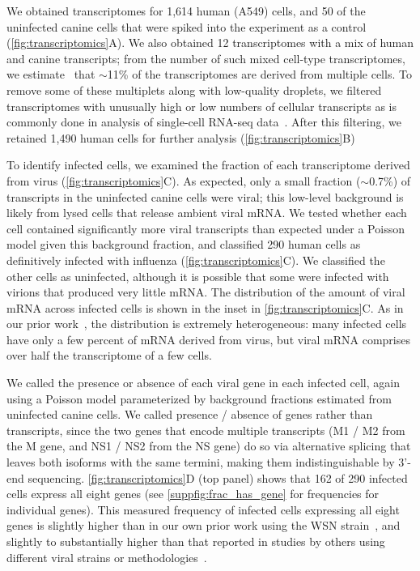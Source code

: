 \documentclass[lineno]{asm-article}
\newcommand{\FIG}[1]{\autoref{fig:#1}}
\newcommand{\SUPPFIG}[1]{\autoref{suppfig:#1}}
\begin{document}
We obtained transcriptomes for 1,614 human (A549) cells, and 50 of the uninfected canine cells that were spiked into the experiment as a control (\FIG{transcriptomics}A).
We also obtained 12 transcriptomes with a mix of human and canine transcripts; from the number of such mixed cell-type transcriptomes, we estimate~\cite{bloom2018estimating} that $\sim$11\% of the transcriptomes are derived from multiple cells.
To remove some of these multiplets along with low-quality droplets, we filtered transcriptomes with unusually high or low numbers of cellular transcripts as is commonly done in analysis of single-cell RNA-seq data~\cite{haque2017practical}.
After this filtering, we retained 1,490 human cells for further analysis (\FIG{transcriptomics}B)

To identify infected cells, we examined the fraction of each transcriptome derived from virus (\FIG{transcriptomics}C).
As expected, only a small fraction ($\sim$0.7\%) of transcripts in the uninfected canine cells were viral; this low-level background is likely from lysed cells that release ambient viral mRNA.
We tested whether each cell contained significantly more viral transcripts than expected under a Poisson model given this background fraction, and classified 290 human cells as definitively infected with influenza (\FIG{transcriptomics}C).
We classified the other cells as uninfected, although it is possible that some were infected with virions that produced very little mRNA.
The distribution of the amount of viral mRNA across infected cells is shown in the inset in \FIG{transcriptomics}C.
As in our prior work~\cite{russell2018extreme}, the distribution is extremely heterogeneous: many infected cells have only a few percent of mRNA derived from virus, but viral mRNA comprises over half the transcriptome of a few cells.

We called the presence or absence of each viral gene in each infected cell, again using a Poisson model parameterized by background fractions estimated from uninfected canine cells.
We called presence / absence of genes rather than transcripts, since the two genes that encode multiple transcripts (M1 / M2 from the M gene, and NS1 / NS2 from the NS gene) do so via alternative splicing that leaves both isoforms with the same termini, making them indistinguishable by 3'-end sequencing.
\FIG{transcriptomics}D (top panel) shows that 162 of 290 infected cells express all eight genes (see \SUPPFIG{frac_has_gene} for frequencies for individual genes).
This measured frequency of infected cells expressing all eight genes is slightly higher than in our own prior work using the WSN strain~\cite{russell2018extreme}, and slightly to substantially higher than that reported in studies by others using different viral strains or methodologies~\cite{heldt2015single, brooke2013most, dou2017analysis, jacobs2019incomplete}. 
\end{document}
